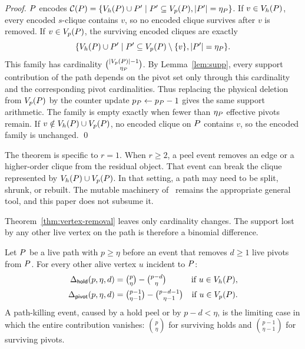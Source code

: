 \begin{proof}
\(\TPath\) encodes \(\mathcal{C}(\TPath)=\{\Vh(\TPath)\cup P'\mid P'\subseteq\Vp(\TPath), |P'|=\eta_{\TPath}\}\).
%
If \(v\in\Vh(\TPath)\), every encoded \(s\)-clique contains \(v\), so no encoded clique survives after \(v\) is removed.
%
If \(v\in\Vp(\TPath)\), the surviving encoded cliques are exactly
\[
\{\Vh(\TPath)\cup P'\mid P'\subseteq\Vp(\TPath)\setminus\{v\}, |P'|=\eta_{\TPath}\}.
\]
This family has cardinality \(\binom{|\Vp(\TPath)|-1}{\eta_{\TPath}}\).
%
By Lemma~\ref{lem:supp}, every support contribution of the path depends on the pivot set only through this cardinality and the corresponding pivot cardinalities.
%
Thus replacing the physical deletion from \(\Vp(\TPath)\) by the counter update \(p_{\TPath}\leftarrow p_{\TPath}-1\) gives the same support arithmetic.
%
The family is empty exactly when fewer than \(\eta_{\TPath}\) effective pivots remain.
%
If \(v\notin\Vh(\TPath)\cup\Vp(\TPath)\), no encoded clique on \(\TPath\) contains \(v\), so the encoded family is unchanged.
%
\qed
\end{proof}

The theorem is specific to \(r=1\).
%
When \(r\ge2\), a peel event removes an edge or a higher-order clique from the residual object.
%
That event can break the clique represented by \(\Vh(\TPath)\cup\Vp(\TPath)\).
%
In that setting, a path may need to be split, shrunk, or rebuilt.
%
The mutable \cpi{} machinery of~\cite{NuclearCD} remains the appropriate general tool, and this paper does not subsume it.

Theorem~\ref{thm:vertex-removal} leaves only cardinality changes.
%
The support lost by any other live vertex on the path is therefore a binomial difference.

\begin{lemma}\label{lem:support-delta}
Let \(\TPath\) be a live path with \(p\ge\eta\) before an event that removes \(d\ge1\) live pivots from \(\TPath\).
%
For every other alive vertex \(u\) incident to \(\TPath\):
\begin{align*}
\Delta_{\hold}(p,\eta,d) &= \tbinom{p}{\eta}-\tbinom{p-d}{\eta} & \text{if }u\in\Vh(\TPath), \\
\Delta_{\pivot}(p,\eta,d)&= \tbinom{p-1}{\eta-1}-\tbinom{p-d-1}{\eta-1} & \text{if }u\in\Vp(\TPath).
\end{align*}
A path-killing event, caused by a hold peel or by \(p-d<\eta\), is the limiting case in which the entire contribution vanishes: \(\binom{p}{\eta}\) for surviving holds and \(\binom{p-1}{\eta-1}\) for surviving pivots.
\end{lemma}

